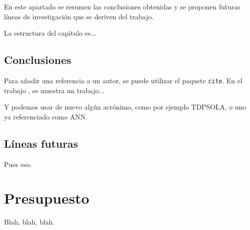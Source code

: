 \documentclass[spanish,openright]{book}
\newcommand{\myreferencespath}{}
\begin{document}
En este apartado se resumen las conclusiones obtenidas y se proponen
futuras líneas de investigación que se deriven del trabajo.

La estructura del capítulo es...


\section{Conclusiones}
\label{sec:conclusiones}

Para añadir una referencia a un autor, se puede utilizar el paquete
\texttt{cite}. En el trabajo \cite{armani03}, se muestra un trabajo...

Y podemos usar de nuevo algún acrónimo, como por ejemplo \ac{TDPSOLA}, o
uno ya referenciado como \ac{ANN}.


\section{Líneas futuras}
\label{sec:lineas-futuras}

Pues eso.





 




\chapter{Presupuesto}
\label{cha:presupuesto}

Blah, blah, blah.

 







\newcommand{\mybibfileOne}{biblio/biblio.bib}


\newcommand{\mybibfiles}{\myreferencespath\mybibfileOne}







 
\end{document}
